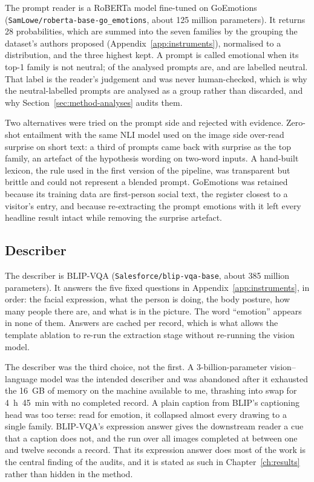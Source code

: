 The prompt reader is a RoBERTa model fine-tuned on GoEmotions \cite{demszky2020goemotions} (\texttt{SamLowe/roberta-base-go\_emotions}, about 125 million parameters). It returns 28 probabilities, which are summed into the seven families by the grouping the dataset's authors proposed (Appendix~\ref{app:instruments}), normalised to a distribution, and the three highest kept. A prompt is called emotional when its top-1 family is not neutral; \nEmotional{} of the \nAnalysed{} analysed prompts are, and \nNonEmotional{} are labelled neutral. That label is the reader's judgement and was never human-checked, which is why the neutral-labelled prompts are analysed as a group rather than discarded, and why Section~\ref{sec:method-analyses} audits them.

Two alternatives were tried on the prompt side and rejected with evidence. Zero-shot entailment with the same NLI model used on the image side over-read surprise on short text: a third of prompts came back with surprise as the top family, an artefact of the hypothesis wording on two-word inputs. A hand-built lexicon, the rule used in the first version of the pipeline, was transparent but brittle and could not represent a blended prompt. GoEmotions was retained because its training data are first-person social text, the register closest to a visitor's entry, and because re-extracting the prompt emotions with it left every headline result intact while removing the surprise artefact.

\subsection{Describer}

The describer is BLIP-VQA \cite{li2022blip} (\texttt{Salesforce/blip-vqa-base}, about 385 million parameters). It answers the five fixed questions in Appendix~\ref{app:instruments}, in order: the facial expression, what the person is doing, the body posture, how many people there are, and what is in the picture. The word ``emotion'' appears in none of them. Answers are cached per record, which is what allows the template ablation to re-run the extraction stage without re-running the vision model.

The describer was the third choice, not the first. A 3-billion-parameter vision--language model was the intended describer and was abandoned after it exhausted the 16~GB of memory on the machine available to me, thrashing into swap for 4~h~45~min with no completed record. A plain caption from BLIP's captioning head was too terse: read for emotion, it collapsed almost every drawing to a single family. BLIP-VQA's expression answer gives the downstream reader a cue that a caption does not, and the run over all \nTotal{} images completed at between one and twelve seconds a record. That its expression answer does most of the work is the central finding of the audits, and it is stated as such in Chapter~\ref{ch:results} rather than hidden in the method.


